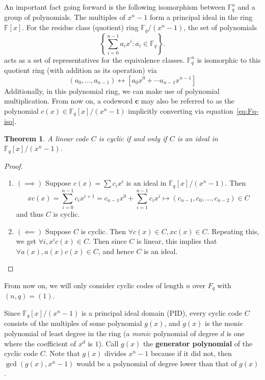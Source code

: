 \documentclass{article}
\newcommand{\F}{\mathbb{F}}
\newcommand{\mt}{\mapsto}
\renewcommand{\=}{\equiv}
\newcommand{\set}[1]{\left\{ #1 \right\}}
\renewcommand{\v}{\mathbf}
\theoremstyle{plain}
\newtheorem{thm}{Theorem}[subsection]
\theoremstyle{definition}
\begin{document}
An important fact going forward is the following isomorphism between $\F_q^n$ and a group of polynomials.
The multiples of $x^n - 1$ form a principal ideal in the ring $\F[x]$.
For the residue class (quotient) ring $\F_q / (x^n - 1)$, the set of polynomials
$$ \set{ \sum_{i=0}^{n-1} a_i x^i : a_i \in \F_q }. $$
acts as a set of representatives for the equivalence classes.
$\F_q^n$ is isomorphic to this quotient ring (with addition as its operation) via
\begin{equation}
  \label{eq:Fq-iso}
  (a_0, \dots, a_{n-1}) \leftrightarrow [a_0 x^0 + \cdots a_{n-1} x^{n-1}]
\end{equation}
Additionally, in this polynomial ring, we can make use of polynomial multiplication.
From now on, a codeword $\v c$ may also be referred to as the polynomial $c(x) \in \F_q[x] / (x^n-1)$ implicitly converting via equation~\ref{eq:Fq-iso}.

\begin{thm}
  A linear code $C$ is cyclic if and only if $C$ is an ideal in $\F_q[x]/(x^n-1)$.
\end{thm}
\begin{proof}\hspace{0em}
\begin{enumerate}
\item[]
$(\implies)$
Suppose $c(x) = \sum c_i x^i$ is an ideal in $\F_q[x]/(x^n-1)$.
Then
$$ x c(x) = \sum_{i=0}^{n-1} c_i x^{i+1} = c_{n-1} x^0 + \sum_{i=1}^{n-1} c_i x^{i} \mt (c_{n-1}, c_0, \dots, c_{n-2}) \in C $$
and thus $C$ is cyclic.

\item[]
$(\impliedby)$
Suppose $C$ is cyclic.
Then $\forall c(x) \in C, x c(x) \in C$.
Repeating this, we get $\forall i, x^i c(x) \in C$.
Then since $C$ is linear, this implies that $\forall a(x), a(x) c(x) \in C$,
and hence $C$ is an ideal.
\end{enumerate}
\end{proof}

\noindent
From now on, we will only consider cyclic codes of length $n$ over $F_q$ with $(n, q) = (1)$.
\vspace{1em}

Since $\F_q[x]/(x^n-1)$ is a principal ideal domain (PID), every cyclic code $C$ consists of the multiples of some polynomial $g(x)$, and $g(x)$ is the monic polynomial of least degree in the ring (a \textit{monic} polynomial of degree $d$ is one where the coefficient of $x^d$ is $1$).
Call $g(x)$ the \textbf{generator polynomial} of the cyclic code $C$.
Note that $g(x)$ divides $x^n-1$ because if it did not, then $\gcd(g(x), x^n-1)$ would be a polynomial of degree lower than that of $g(x)$.
\end{document}
